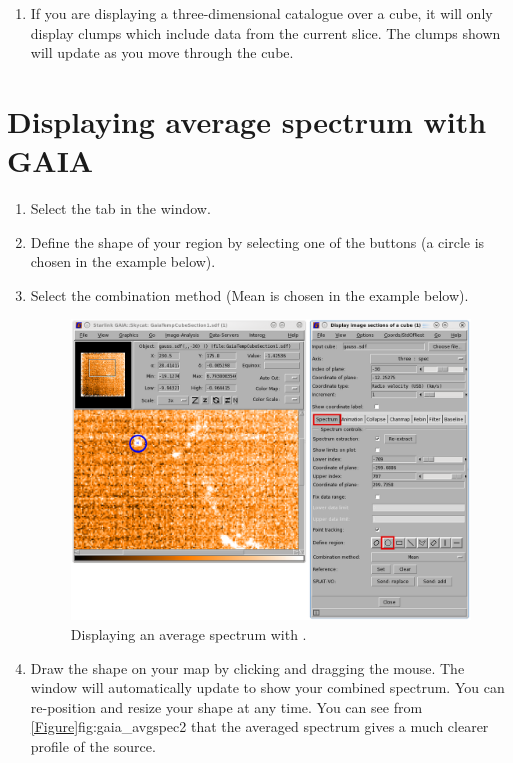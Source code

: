 \documentclass[11pt,oneside,chapters]{starlink}
\begin{document}
\begin{enumerate}[label=(\textbf{\arabic*})]
\item If you are displaying a three-dimensional catalogue over a cube,
it will only display clumps which include data from the current slice.
The clumps shown will update as you move through the cube.

\end{enumerate}

\section{Displaying average spectrum with GAIA}

\begin{enumerate}[label=(\textbf{\arabic*})]
\item Select the  tab in the  window.

\item Define the shape of your region by selecting one of the
 buttons (a circle is chosen in the example
below).

\item Select the combination method (Mean is chosen in the example below).

\begin{figure}[h!]
\begin{center}
\includegraphics[width=0.8\linewidth]{sc20_gaia_avgspec1}
\end{center}
\caption[Displaying an average spectrum with \gaia.]{\label{fig:gaia_avgspec1}
  Displaying an average spectrum with \gaia.}
\end{figure}

\item Draw the shape on your map by clicking and dragging the mouse.
The  window will automatically update to show
your combined spectrum. You can re-position and resize your shape at
any time. You can see from \cref{Figure}{fig:gaia_avgspec2}{} that the
averaged spectrum gives a much clearer profile of the source.



\end{enumerate}
\end{document}
